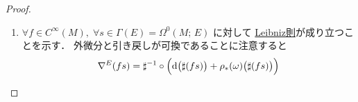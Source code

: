 \documentclass[TQFT_main]{subfiles}
\begin{document}
\begin{proof}
\begin{enumerate}
        \item 
        $\forall f \in C^\infty(M),\; \forall s \in \Gamma(E) = \Omega^0(M;\, E)$ に対して
        \hyperref[def:connection-vect]{Leibniz則}が成り立つことを示す．
        外微分と引き戻しが可換であることに注意すると
        \begin{align}
            \nabla^E (fs)
            &= \sharp^{-1} \circ \Bigl( \dd\bigl(\sharp (fs)\bigr) + \rho_* (\omega) \bigl( \sharp(fs) \bigr)   \Bigr) \\

\end{align}
\end{enumerate}
\end{proof}
\end{document}
